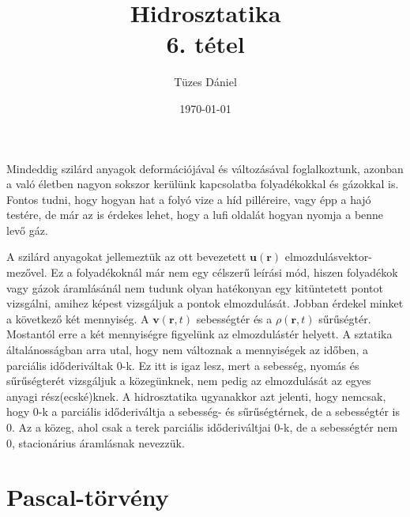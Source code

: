\documentclass[12pt,a4paper]{scrartcl}
\title{Hidrosztatika\\{\small{6. tétel}}}
\author{Tüzes Dániel}
\date{\today}
\let\mathbf\bm
\begin{document}
\maketitle

Mindeddig szilárd anyagok deformációjával és változásával foglalkoztunk, azonban a való életben nagyon sokszor kerülünk kapcsolatba folyadékokkal és gázokkal is. Fontos tudni, hogy hogyan hat a folyó vize a híd pilléreire, vagy épp a hajó testére, de már az is érdekes lehet, hogy a lufi oldalát hogyan nyomja a benne levő gáz.

A szilárd anyagokat jellemeztük az ott bevezetett ${\mathbf{u}}\left( {\mathbf{r}} \right)$ elmozdulásvektor-mezővel. Ez a folyadékoknál már nem egy célszerű leírási mód, hiszen folyadékok vagy gázok áramlásánál nem tudunk olyan hatékonyan egy kitüntetett pontot vizsgálni, amihez képest vizsgáljuk a pontok elmozdulását. Jobban érdekel minket a következő két mennyiség. A ${\mathbf{v}}\left( {{\mathbf{r}},t} \right)$ sebességtér és a $\rho \left( {{\mathbf{r}},t} \right)$ sűrűségtér. Mostantól erre a két mennyiségre figyelünk az elmozdulástér helyett. A sztatika általánosságban arra utal, hogy nem változnak a mennyiségek az időben, a parciális időderiváltak 0-k. Ez itt is igaz lesz, mert a sebesség, nyomás és sűrűségterét vizsgáljuk a közegünknek, nem pedig az elmozdulását az egyes anyagi rész(ecské)knek. A hidrosztatika ugyanakkor azt jelenti, hogy nemcsak, hogy 0-k a parciális időderiváltja a sebesség- és sűrűségtérnek, de a sebességtér is 0. Az a közeg, ahol csak a terek parciális időderiváltjai 0-k, de a sebességtér nem 0, stacionárius áramlásnak nevezzük.

\section{Pascal-törvény}
\end{document}
